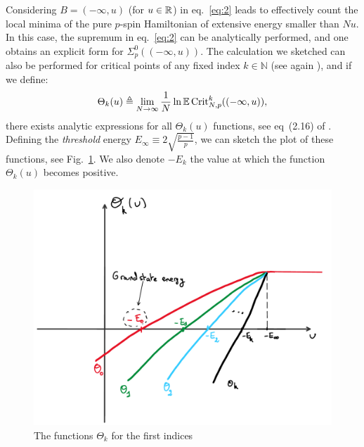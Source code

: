 \documentclass[amsmath,amssymb,nofootinbib,prd]{article}
\begin{document}
Considering $B = (-\infty,u)$ (for $u \in \mathbb{R}$) in eq.~\eqref{eq:2} leads to effectively count the local minima of the pure $p$-spin Hamiltonian of extensive energy smaller than $Nu$. 
In this case, the supremum in eq.~\eqref{eq:2} can be analytically performed, and one obtains an explicit form for $\Sigma_p^0((-\infty,u))$.
The calculation we sketched can also be performed for critical points of any fixed index $k \in \mathbb{N}$ (see again \cite{auffinger2013random}), and if we define:
\begin{align}
\Theta_k(u) \triangleq \lim_{N \to \infty} \frac{1}{N} \ln \mathbb{E} \, \mathrm{Crit}_{N,p}^k((-\infty,u)),
\end{align}
there exists analytic expressions for all $\Theta_k(u)$ functions, see eq~(2.16) of \cite{auffinger2013random}. 
Defining the \emph{threshold} energy $E_\infty \equiv 2 \sqrt{\frac{p-1}{p}}$, we can sketch the plot of these functions, see Fig.~\ref{fig:fig}.
We also denote $-E_k$ the value at which the function $\Theta_k(u)$ becomes positive.
	\begin{figure}
	\centering
\includegraphics[scale=0.4]{figure.pdf}
\caption{The functions $\Theta_k$ for the first indices}\label{fig:fig}
\end{figure}
\end{document}
